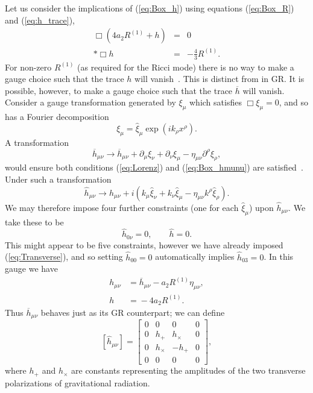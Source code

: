 \documentclass[aps,prd,amsfonts,amssymb,amsmath,nofootinbib,reprint,showpacs]{revtex4-1}
\newcommand{\eqnref}[1]{(\ref{eq:#1})}
\begin{document}
Let us consider the implications of \eqnref{Box_h} using equations \eqnref{Box_R} and \eqnref{h_trace},
\begin{eqnarray}
\Box\left(4a_2R^{(1)} + h\right) & = & 0 \nonumber \\*
\Box h & = & -\frac{4}{3}R^{(1)}.
\end{eqnarray}
For non-zero $R^{(1)}$ (as required for the Ricci mode) there is no way to make a gauge choice such that the trace $h$ will vanish~\cite{Corda2007, Capozziello2008}. This is distinct from in GR. It is possible, however, to make a gauge choice such that the trace $\overline{h}$ will vanish. Consider a gauge transformation generated by $\xi_\mu$ which satisfies $\Box \xi_\mu = 0$, and so has a Fourier decomposition
\begin{equation}
\xi_\mu = \widehat{\xi}_\mu \exp\left(ik_\rho x^\rho\right).
\end{equation}
A transformation
\begin{equation}
\overline{h}_{\mu\nu} \rightarrow \overline{h}_{\mu\nu} + \partial_\mu\xi_\nu + \partial_\nu\xi_\mu - \eta_{\mu\nu}\partial^\rho\xi_\rho,
\end{equation}
would ensure both conditions \eqnref{Lorenz} and \eqnref{Box_hmunu} are satisfied~\cite{Misner1973}. Under such a transformation
\begin{equation}
\widehat{h}_{\mu\nu} \rightarrow \widehat{h}_{\mu\nu} + i\left(k_\mu\widehat{\xi}_\nu + k_\nu\widehat{\xi}_\mu - \eta_{\mu\nu}k^\rho\widehat{\xi}_\rho\right).
\end{equation}
We may therefore impose four further constraints (one for each $\widehat{\xi}_\mu$) upon $\widehat{h}_{\mu\nu}$. We take these to be
\begin{equation}
\widehat{h}_{0\nu} = 0, \qquad \widehat{h} = 0.
\end{equation}
This might appear to be five constraints, however we have already imposed \eqnref{Transverse}, and so setting $\widehat{h}_{00} = 0$ automatically implies $\widehat{h}_{03} = 0$. In this gauge we have
\begin{equation}
\begin{split}
h_{\mu\nu} & = {} \overline{h}_{\mu\nu} - a_2 R^{(1)}\eta_{\mu\nu},\\
h & = {} -4a_2R^{(1)}.
\end{split}
\label{eq:gauge}
\end{equation}
Thus $\overline{h}_{\mu\nu}$ behaves just as its GR counterpart; we can define
\begin{equation}
\left[\widehat{h}_{\mu\nu}\right] =
\begin{bmatrix}
0 & 0 & 0 & 0\\
0 & h_+ & h_\times & 0\\
0 & h_\times & -h_+ & 0\\
0 & 0 & 0 & 0
\end{bmatrix},
\end{equation}
where $h_+$ and $h_\times$ are constants representing the amplitudes of the two transverse polarizations of gravitational radiation.
\end{document}
